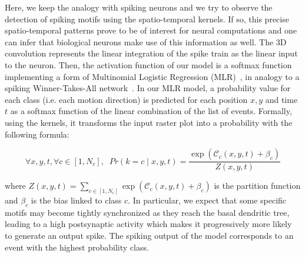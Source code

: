 \documentclass[default]{sn-jnl}%
\theoremstyle{thmstyleone}%
\theoremstyle{thmstyletwo}%
\theoremstyle{thmstylethree}%
\newcommand{\postsynaddr}{b} %
\newcommand{\bias}{\beta} %
\newcommand{\synapse}{\mathcal{S}} %
\newcommand{\timev}{t} %
\newcommand{\class}{c} %
\newcommand{\note}[1]{{\sethlcolor{yellow}\hl{#1}}}
\begin{document}
Here, we keep the analogy with spiking neurons and we try to observe the detection of spiking motifs using the spatio-temporal kernels. If so, this precise spatio-temporal patterns prove to be of interest for neural computations and one can infer that biological neurons make use of this information as well. 
The 3D convolution represents the linear integration of the spike train as the linear input to the neuron. Then, the activation function of our model is a softmax function implementing a form of Multinomial Logistic Regression (MLR)~\citep{grimaldi_robust_2022}, in analogy to a spiking Winner-Takes-All network~\citep{nessler_bayesian_2013}. In our MLR model, a probability value for each class (i.e. each motion direction) is predicted for each position $x, y$ and time $\timev$ as a softmax function of the linear combination of the list of events. %
Formally, using the kernels, it transforms the input raster plot into a probability with the following formula:
%
\begin{linenomath*}
\begin{equation}\label{eq:mlr}
    \forall x, y, \timev, \forall \class \in [1, N_\class], \; \;
Pr(k=\class \; \vert \;  x, y, \timev) =
\frac {\exp  (\mathcal{C}_\class(x, y, \timev) +\bias_\class) }{Z(x, y, \timev)}
\end{equation} 
\end{linenomath*}
%
where $Z(x, y, \timev)=\sum_{\class \in [1, N_\class]} \exp  (\mathcal{C}_\class(x, y, \timev) +\bias_\class)$ is the partition function and  $\bias_\class$ is the bias linked to class $\class$. 
In particular, we expect that some specific motifs may become tightly synchronized as they reach the basal dendritic tree, leading to a high postsynaptic activity which makes it progressively more likely to generate an output spike. The spiking output of the model corresponds to an event with the highest probability class. 
\end{document}
